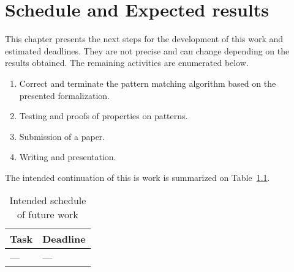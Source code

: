 \chapter{Schedule and Expected results}\label{chap:future-work}

This chapter presents the next steps for the development of this work and 
estimated deadlines. They are not precise and can change depending on the results
obtained. The remaining activities are enumerated below.

\begin{enumerate}
    \item Correct and terminate the pattern matching algorithm based on the 
        presented formalization.
    \item Testing and proofs of properties on patterns.
    \item Submission of a paper.
    \item Writing and presentation.
\end{enumerate}

The intended continuation of this is work is summarized on Table~\ref{table:schedule}.

\begin{table}[ht]
    \centering
    \caption{Intended schedule of future work}
    \label{table:schedule}
    \begin{tabular}{ll}
        \hline
        \textbf{Task} & \textbf{Deadline} \\
        \hline
        --- & ---\\
        \hline
    \end{tabular}
\end{table}